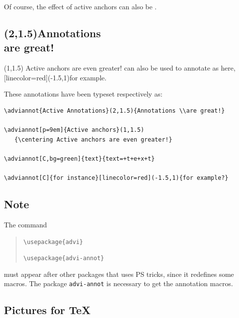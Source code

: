 \documentclass[12pt]{article}
\begin{document}
\medskip
Of course, the effect of active anchors can also be 
.

\SpecialCoor
{}
  {%
}


\newpage

\subsection*{(2,1.5){Annotations \\are great!}}

\noindent
{}(1,1.5)
{\centering Active anchors are even greater!}
can also be used to annotate  as
here, [linecolor=red](-1.5,1){for example}. 

\medskip

\noindent
These annotations have been typeset respectively as:
\begin{small}
\begin{verbatim}
\adviannot{Active Annotations}(2,1.5){Annotations \\are great!}

\adviannot[p=9em]{Active anchors}(1,1.5)
   {\centering Active anchors are even greater!}

\adviannot[C,bg=green]{text}{text=+t+e+x+t}

\adviannot[C]{for instance}[linecolor=red](-1.5,1){for example?}
\end{verbatim}
\end{small}

\newpage

\subsection*{Note}

The command 
\begin{quote}

\verb"\usepackage{advi}"

\verb"\usepackage{advi-annot}"

\end{quote}
must appear after other packages that uses PS tricks, since it redefines
some macros.  The package \verb"advi-annot" is necessary to get
the annotation macros.

\newpage

\subsection*{Pictures for \TeX}
\end{document}

